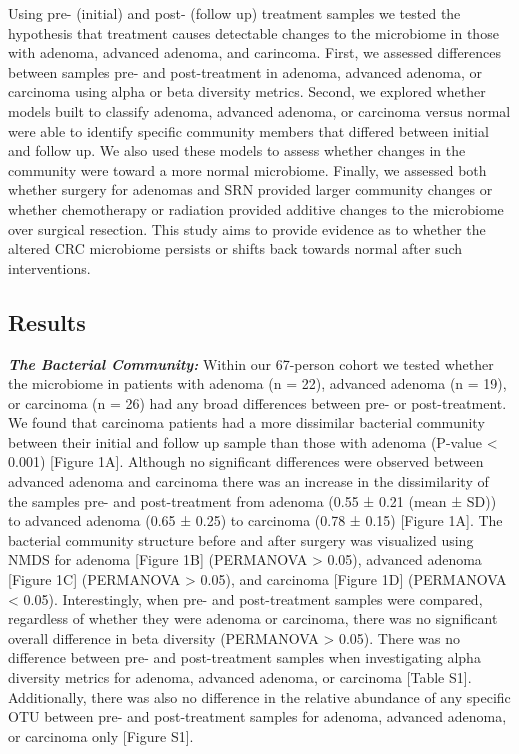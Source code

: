 \documentclass[12pt,]{article}
\begin{document}
Using pre- (initial) and post- (follow up) treatment samples we tested
the hypothesis that treatment causes detectable changes to the
microbiome in those with adenoma, advanced adenoma, and carincoma.
First, we assessed differences between samples pre- and post-treatment
in adenoma, advanced adenoma, or carcinoma using alpha or beta diversity
metrics. Second, we explored whether models built to classify adenoma,
advanced adenoma, or carcinoma versus normal were able to identify
specific community members that differed between initial and follow up.
We also used these models to assess whether changes in the community
were toward a more normal microbiome. Finally, we assessed both whether
surgery for adenomas and SRN provided larger community changes or
whether chemotherapy or radiation provided additive changes to the
microbiome over surgical resection. This study aims to provide evidence
as to whether the altered CRC microbiome persists or shifts back towards
normal after such interventions.

\newpage

\subsection{Results}\label{results}

\textbf{\emph{The Bacterial Community:}} Within our 67-person cohort we
tested whether the microbiome in patients with adenoma (n = 22),
advanced adenoma (n = 19), or carcinoma (n = 26) had any broad
differences between pre- or post-treatment. We found that carcinoma
patients had a more dissimilar bacterial community between their initial
and follow up sample than those with adenoma (P-value \textless{} 0.001)
{[}Figure 1A{]}. Although no significant differences were observed
between advanced adenoma and carcinoma there was an increase in the
dissimilarity of the samples pre- and post-treatment from adenoma (0.55
± 0.21 (mean ± SD)) to advanced adenoma (0.65 ± 0.25) to carcinoma (0.78
± 0.15) {[}Figure 1A{]}. The bacterial community structure before and
after surgery was visualized using NMDS for adenoma {[}Figure 1B{]}
(PERMANOVA \textgreater{} 0.05), advanced adenoma {[}Figure 1C{]}
(PERMANOVA \textgreater{} 0.05), and carcinoma {[}Figure 1D{]}
(PERMANOVA \textless{} 0.05). Interestingly, when pre- and
post-treatment samples were compared, regardless of whether they were
adenoma or carcinoma, there was no significant overall difference in
beta diversity (PERMANOVA \textgreater{} 0.05). There was no difference
between pre- and post-treatment samples when investigating alpha
diversity metrics for adenoma, advanced adenoma, or carcinoma {[}Table
S1{]}. Additionally, there was also no difference in the relative
abundance of any specific OTU between pre- and post-treatment samples
for adenoma, advanced adenoma, or carcinoma only {[}Figure S1{]}.
\end{document}
